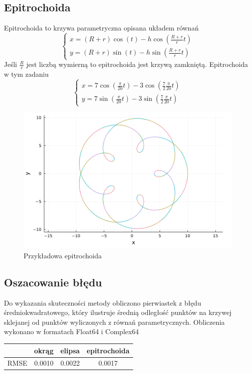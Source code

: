 \documentclass[11pt,wide]{article}
\begin{document}
\subsection{Epitrochoida}
Epitrochoida to krzywa parametryczna opisana układem równań
\begin{equation}
    \begin{cases}
    x = (R+r)\cos(t)-h \cos(\frac{R+r}{r}t)\\
    y = (R+r)\sin(t)-h \sin(\frac{R+r}{r}t)
    \end{cases}
\end{equation}
Jeśli $\frac{R}{r}$ jest liczbą wymierną to epitrochoida jest krzywą zamkniętą. Epitrochoida w tym zadaniu
\begin{equation}
    \begin{cases}
    x = 7\cos(\frac{\pi}{20}t)-3 \cos(\frac{7}{2}\frac{\pi}{20}t)\\
    y = 7\sin(\frac{\pi}{20}t)-3 \sin(\frac{7}{2}\frac{\pi}{20}t)
    \end{cases}
\end{equation}
\begin{figure}[H]
    \centering
    \includegraphics[width=120mm]{epitrochoid.png}
    \caption{Przykładowa epitrochoida}
    \label{fig:my_label}
\end{figure}
\subsection{Oszacowanie błędu}
Do wykazania skuteczności metody obliczono pierwiastek z błędu średniokwadratowego, który ilustruje średnią odległość punktów na krzywej sklejanej od punktów wyliczonych z równań parametrycznych. Obliczenia wykonano w formatach Float64 i Complex64\\
\begin{center}
\begin{tabular}{|l|c|c|c|}
\hline
     & okrąg & elipsa & epitrochoida\\ \hline
     RMSE & 0.0010 & 0.0022 & 0.0017 \\\hline
\end{tabular}
\end{center}
\end{document}
